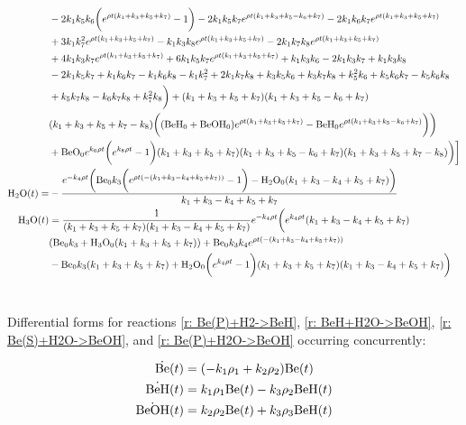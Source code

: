 \begin{align*}
	& -2 k_1 k_5 k_6 \bigg(e^{\rho t (k_1+k_3+k_5+k_7)}-1\bigg)-2 k_1 k_5 k_7 e^{\rho t (k_1+k_3+k_5-k_6+k_7)}-2 k_1 k_6 k_7 e^{\rho t (k_1+k_3+k_5+k_7)}\\
	& +3 k_1 k_7^2 e^{\rho t (k_1+k_3+k_5+k_7)}-k_1 k_3 k_8 e^{\rho t (k_1+k_3+k_5+k_7)}-2 k_1 k_7 k_8 e^{\rho t (k_1+k_3+k_5+k_7)}\\
	& +4 k_1 k_3 k_7 e^{\rho t (k_1+k_3+k_5+k_7)}+6 k_1 k_5 k_7 e^{\rho t (k_1+k_3+k_5+k_7)}+k_1 k_3 k_6-2 k_1 k_3 k_7+k_1 k_3 k_8\\
	& -2 k_1 k_5 k_7+k_1 k_6 k_7-k_1 k_6 k_8-k_1 k_7^2+2 k_1 k_7 k_8+k_3 k_5 k_6+k_3 k_7 k_8+k_5^2 k_6+k_5 k_6 k_7-k_5 k_6 k_8 \\
	& +k_5 k_7 k_8-k_6 k_7 k_8+k_7^2 k_8\bigg)+(k_1+k_3+k_5+k_7) (k_1+k_3+k_5-k_6+k_7)\\
	& (k_1+k_3+k_5+k_7-k_8) \bigg((\ce{BeH0}+\ce{BeOH0}) e^{\rho t (k_1+k_3+k_5+k_7)}-\ce{BeH0} e^{\rho t (k_1+k_3+k_5-k_6+k_7)}\bigg)\bigg)\\
	& +\ce{BeO0} e^{k_6 \rho t} \bigg(e^{k_8 \rho t}-1\bigg) (k_1+k_3+k_5+k_7) (k_1+k_3+k_5-k_6+k_7) (k_1+k_3+k_5+k_7-k_8)\bigg)\bigg] \\
	\ce{H2O}(t) = & -\frac{e^{-k_4 \rho t} \bigg(\ce{Be0} k_3 \bigg(e^{\rho t (-(k_1+k_3-k_4+k_5+k_7))}-1\bigg)-\ce{H2O0} (k_1+k_3-k_4+k_5+k_7)\bigg)}{k_1+k_3-k_4+k_5+k_7} \\
	\ce{H3O}(t) & = \frac{1}{(k_1+k_3+k_5+k_7) (k_1+k_3-k_4+k_5+k_7)}e^{-k_4 \rho t} \bigg(e^{k_4 \rho t} (k_1+k_3-k_4+k_5+k_7)\\
	& (\ce{Be0} k_3+\ce{H3O0} (k_1+k_3+k_5+k_7))+\ce{Be0} k_3 k_4 e^{\rho t (-(k_1+k_3-k_4+k_5+k_7))}\\
	& -\ce{Be0} k_3 (k_1+k_3+k_5+k_7)+\ce{H2O0} \bigg(e^{k_4 \rho t}-1\bigg) (k_1+k_3+k_5+k_7) (k_1+k_3-k_4+k_5+k_7)\bigg)
\end{align*}

\section{} \label{sec: Be+H2O+H2 eqs}

Differential forms for reactions \ref{r: Be(P)+H2->BeH}, \ref{r: BeH+H2O->BeOH}, \ref{r: Be(S)+H2O->BeOH}, and \ref{r: Be(P)+H2O->BeOH} occurring concurrently:

\begin{align}
	\dot{\ce{Be}}(t) & = (-k_1 \rho_1 + k_2 \rho_2) \ce{Be}(t) \\
	\dot{\ce{BeH}}(t) & = k_1 \rho_1 \ce{Be}(t) - k_3 \rho_2 \ce{BeH}(t) \\
	\dot{\ce{BeOH}}(t) & = k_2 \rho_2 \ce{Be}(t) + k_3 \rho_3 \ce{BeH}(t)
\end{align}

